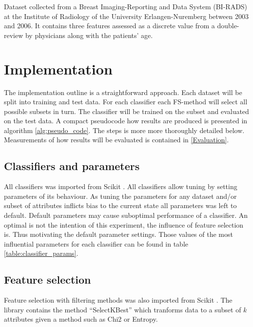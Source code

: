 Dataset collected from a Breast Imaging-Reporting and Data System (BI-RADS) at the Institute of Radiology of the University Erlangen-Nuremberg between 2003 and 2006. It contains three features assessed as a discrete value from a double-review by physicians along with the patients' age.




\section{Implementation}

The implementation outline is a straightforward approach. Each dataset will be split into training and test data. For each classifier each FS-method will select all possible subsets in turn. The classifier will be trained on the subset and evaluated on the test data. A compact pseudocode how results are produced is presented in algorithm \ref{alg:pseudo_code}. The steps is more more thoroughly detailed below. Measurements of how results will be evaluated is contained in \ref{Evaluation}.



\subsection{Classifiers and parameters}
All classifiers was imported from Scikit \parencite{scikit-learn}. All classifiers allow tuning by setting parameters of its behaviour. As tuning the parameters for any dataset and/or subset of attributes inflicts bias to the current state all parameters was left to default. Default parameters may cause suboptimal performance of a classifier. An optimal is not the intention of this experiment, the influence of feature selection is. Thus motivating the default parameter settings. Those values of the most influential parameters for each classifier can be found in table \ref{table:classifier_params}.


\subsection{Feature selection}

Feature selection with filtering methods was also imported from  Scikit \parencite{scikit-learn}. The library contains the method ``SelectKBest'' which tranforms data to a subset of $k$ attributes given a method such as Chi2 or Entropy.

